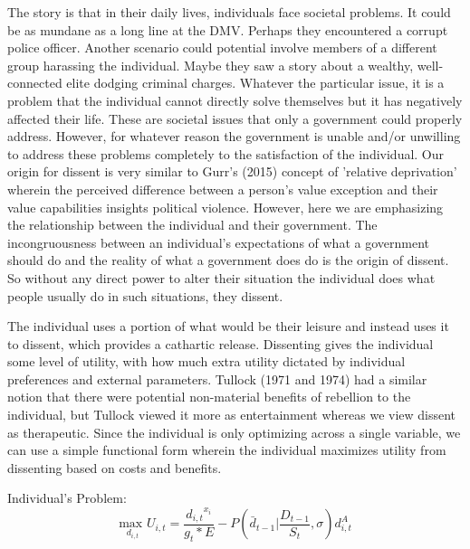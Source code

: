 \documentclass[12pt]{article}
\begin{document}
\begin{spacing}{1.5}
The story is that in their daily lives, individuals face societal problems. It could be as mundane as a long line at the DMV. Perhaps they encountered a corrupt police officer. Another scenario could potential involve members of a different group harassing the individual. Maybe they saw a story about a wealthy, well-connected elite dodging criminal charges. Whatever the particular issue, it is a problem that the individual cannot directly solve themselves but it has negatively affected their life. These are societal issues that only a government could properly address. However, for whatever reason the government is unable and/or unwilling to address these problems completely to the satisfaction of the individual. Our origin for dissent is very similar to Gurr's (2015) concept of 'relative deprivation' wherein the perceived difference between a person's value exception and their value capabilities insights political violence. However, here we are emphasizing the relationship between the individual and their government. The incongruousness between an individual's expectations of what a government should do and the reality of what a government does do is the origin of dissent. So without any direct power to alter their situation the individual does what people usually do in such situations, they dissent. 

The individual uses a portion of what would be their leisure and instead uses it to dissent, which provides a cathartic release. Dissenting gives the individual some level of utility, with how much extra utility dictated by individual preferences and external parameters. Tullock (1971 and 1974) had a similar notion that there were potential non-material benefits of rebellion to the individual, but Tullock viewed it more as entertainment whereas we view dissent as therapeutic. Since the individual is only optimizing across a single variable, we can use a simple functional form wherein the individual maximizes utility from dissenting based on costs and benefits. 

\vspace{.5 em}
\noindent Individual's Problem:
\begin{equation}
{\underset{d_{i,t}}{\text{max }}}  U_{i,t}= \frac{{d_{i,t}}^{{x}_i}}{g_t * E} - P \left( \bar{d}_{t-1} \Bigg|\frac{D_{t-1}}{S_t},\sigma \right)d_{i,t}^A
\end{equation}


\end{spacing}
\end{document}
